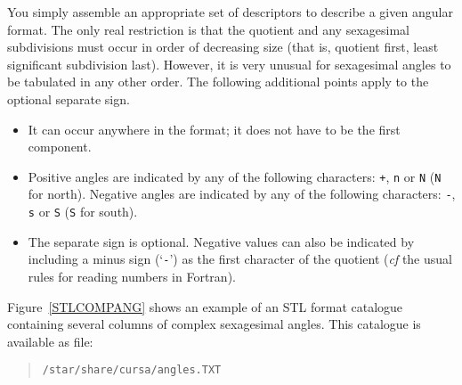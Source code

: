 \documentclass[twoside,11pt]{article}
\renewcommand{\_}{\texttt{\symbol{95}}}
\begin{document}
You simply assemble an appropriate set of descriptors to describe a
given angular format.  The only real restriction is that the quotient
and any sexagesimal subdivisions must occur in order of decreasing size
(that is, quotient first, least significant subdivision last).  However,
it is very unusual for sexagesimal angles to be tabulated in any other
order.  The following additional points apply to the optional separate
sign.

\begin{itemize}

  \item It can occur anywhere in the format; it does not have to be
   the first component.

  \item Positive angles are indicated by any of the following
   characters: {\tt +}, {\tt n} or {\tt N} ({\tt N} for north).
   Negative angles are indicated by any of the following characters:
   {\tt -}, {\tt s} or {\tt S} ({\tt S} for south).

  \item The separate sign is optional.  Negative values can also be
   indicated by including a minus sign (`{\tt -}') as the first
   character of the quotient ({\it cf}\/ the usual rules for reading
   numbers in Fortran).

\end{itemize}

Figure~\ref{STLCOMPANG} shows an example of an STL format catalogue
containing several columns of complex sexagesimal angles.  This
catalogue is available as file:

\begin{verse}
{\tt /star/share/cursa/angles.TXT}
\end{verse}
\end{document}
